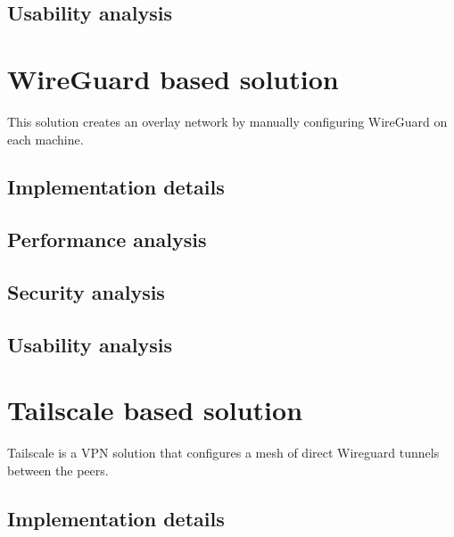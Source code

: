 \hypertarget{usability-analysis}{%
\section{Usability analysis}\label{usability-analysis}}

\hypertarget{wireguard-based-solution}{%
\chapter{WireGuard based solution}\label{wireguard-based-solution}}

This solution creates an overlay network by manually configuring
WireGuard on each machine.

\hypertarget{implementation-details}{%
\section{Implementation details}\label{implementation-details}}

\hypertarget{performance-analysis}{%
\section{Performance analysis}\label{performance-analysis}}

\hypertarget{security-analysis}{%
\section{Security analysis}\label{security-analysis}}

\hypertarget{usability-analysis}{%
\section{Usability analysis}\label{usability-analysis}}

\hypertarget{tailscale-based-solution}{%
\chapter{Tailscale based solution}\label{tailscale-based-solution}}

Tailscale is a VPN solution that configures a mesh of direct Wireguard
tunnels between the peers.

\hypertarget{implementation-details}{%
\section{Implementation details}\label{implementation-details}}

